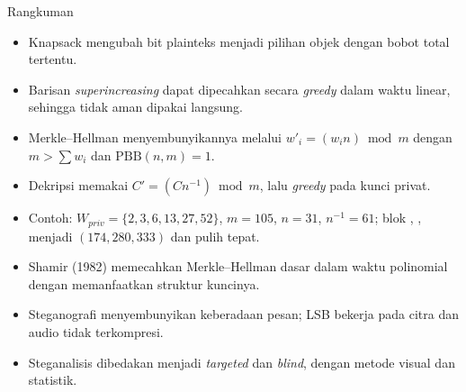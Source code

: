 \documentclass[aspectratio=169,11pt]{beamer}
\begin{document}
\begin{frame}{Rangkuman}
    \footnotesize
    \begin{itemize}
        \item Knapsack mengubah bit plainteks menjadi pilihan objek dengan
              bobot total tertentu.
        \item Barisan \textit{superincreasing} dapat dipecahkan secara
              \textit{greedy} dalam waktu linear, sehingga tidak aman dipakai
              langsung.
        \item Merkle--Hellman menyembunyikannya melalui
              $w'_i=(w_i n)\bmod m$ dengan $m>\sum w_i$ dan
              $\mathrm{PBB}(n,m)=1$.
        \item Dekripsi memakai $C'=(C n^{-1})\bmod m$, lalu \textit{greedy}
              pada kunci privat.
        \item Contoh: $W_{priv}=\{2,3,6,13,27,52\}$, $m=105$, $n=31$,
              $n^{-1}=61$; blok , , 
              menjadi $(174,280,333)$ dan pulih tepat.
        \item Shamir (1982) memecahkan Merkle--Hellman dasar dalam waktu
              polinomial dengan memanfaatkan struktur kuncinya.
        \item Steganografi menyembunyikan keberadaan pesan; LSB bekerja pada
              citra dan audio tidak terkompresi.
        \item Steganalisis dibedakan menjadi \textit{targeted} dan
              \textit{blind}, dengan metode visual dan statistik.
    \end{itemize}
\end{frame}
\end{document}
